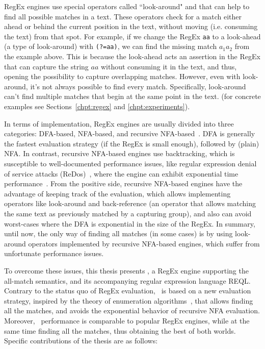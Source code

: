 RegEx engines use special operators called ``look-around" and  that can help to
find all possible matches in a text. These operators check for a match either
ahead or behind the current position in the text, without moving (i.e. consuming
the text) from that spot. For example, if we change the RegEx \texttt{aa} to a
look-ahead (a type of look-around) with \texttt{(?=aa)}, we can find the missing
match $a_1a_2$ from the example above. This is because the look-ahead acts an
assertion in the RegEx that can capture the string $aa$ without consuming it in
the text, and thus, opening the possibility to capture overlapping matches.
However, even with look-around, it's not always possible to find every match.
Specifically, look-around can't find multiple matches that begin at the same
point in the text.  (for concrete examples see Sections~\ref{chpt:regex} and
\ref{chpt:experiments}).

In terms of implementation, RegEx engines are usually divided into three
categories: DFA-based, NFA-based, and recursive NFA-based~\cite{cox2007regular}.
DFA is generally the fastest evaluation strategy (if the RegEx is small enough),
followed by (plain) NFA. In contrast, recursive NFA-based engines use
backtracking, which is susceptible to well-documented performance issues, like
regular expression denial of service attacks (ReDos)~\cite{friedl2006mastering},
where the engine can exhibit exponential time performance~\cite{cox2007regular}.
From the positive side, recursive NFA-based engines have the advantage of
keeping track of the evaluation, which allows implementing operators like
look-around and back-reference (an operator that allows matching the same text
as previously matched by a capturing group), and also can avoid worst-cases
where the DFA is exponential in the size of the RegEx. In summary, until now,
the only way of finding all matches (in some cases) is by using look-around
operators implemented by recursive NFA-based engines, which suffer from
unfortunate performance issues. 

To overcome these issues, this thesis presents \rematch, a RegEx engine
supporting the all-match semantics, and its accompanying regular expression
language REQL. Contrary to the status quo of RegEx evaluation, \rematch\ is
based on a new evaluation strategy, inspired by the theory of enumeration
algorithms~\cite{Segoufin13}, that allows finding all the matches, and avoids
the exponential behavior of recursive NFA evaluation. Moreover, \rematch\
performance is comparable to popular RegEx engines, while at the same time
finding all the matches, thus obtaining the best of both worlds. Specific
contributions of the thesis are as follows:

